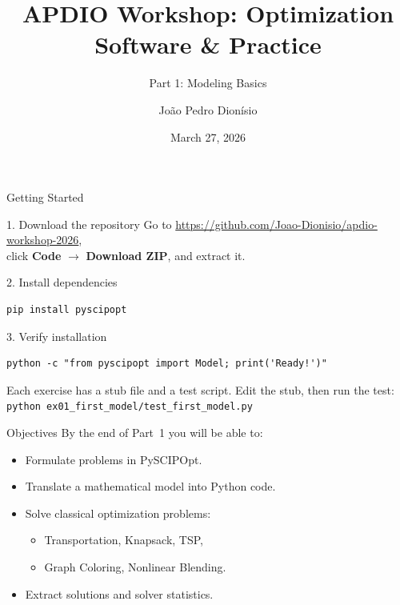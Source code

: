 \documentclass[aspectratio=169,10pt]{beamer}
\title{APDIO Workshop: Optimization Software \& Practice}
\subtitle{Part 1: Modeling Basics}
\author{Jo\~{a}o Pedro Dion\'{i}sio}
\date{March 27, 2026}
\begin{document}
\begin{frame}
\titlepage
\end{frame}

\begin{frame}[fragile]{Getting Started}
\begin{block}{1. Download the repository}
Go to \url{https://github.com/Joao-Dionisio/apdio-workshop-2026},\\
click \textbf{Code} $\rightarrow$ \textbf{Download ZIP}, and extract it.
\end{block}

\begin{block}{2. Install dependencies}
\begin{lstlisting}
pip install pyscipopt
\end{lstlisting}
\end{block}

\begin{block}{3. Verify installation}
\begin{lstlisting}
python -c "from pyscipopt import Model; print('Ready!')"
\end{lstlisting}
\end{block}

\medskip
Each exercise has a stub file and a test script. Edit the stub, then run the test:
\texttt{python ex01\_first\_model/test\_first\_model.py}
\end{frame}

\begin{frame}{Objectives}
By the end of Part~1 you will be able to:
\begin{itemize}
  \item Formulate problems in PySCIPOpt.
  \item Translate a mathematical model into Python code.
  \item Solve classical optimization problems:
    \begin{itemize}
      \item Transportation, Knapsack, TSP,
      \item Graph Coloring, Nonlinear Blending.
    \end{itemize}
  \item Extract solutions and solver statistics.
\end{itemize}
\end{frame}
\end{document}
